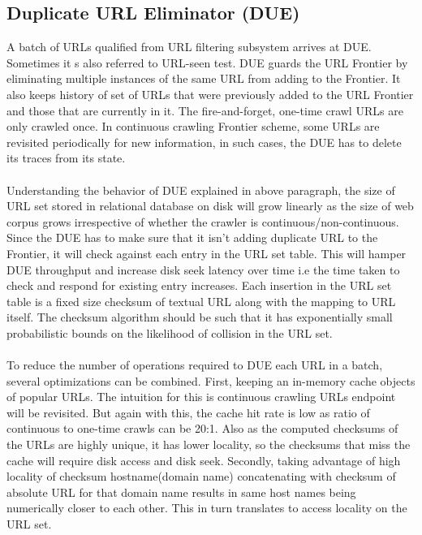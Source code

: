 \subsection{Duplicate URL Eliminator (DUE)}
A batch of URLs qualified from URL filtering subsystem arrives at DUE\cite{mercator}. Sometimes it s also referred to URL-seen test. DUE guards the URL Frontier by eliminating
multiple instances of the same URL from adding to the Frontier. It also keeps history of set of URLs that were previously added to the URL Frontier and those that are
currently in it. The fire-and-forget, one-time crawl URLs are only crawled once. In
continuous crawling Frontier scheme, some URLs are revisited periodically for new information, in such cases, the DUE has to delete its traces from its state.
\\
\\
\noindent
Understanding the behavior of DUE explained in above paragraph, the size of URL set stored in relational database on disk will grow linearly as the size of web corpus grows irrespective of whether the crawler is continuous/non-continuous. Since the DUE has to make sure that it isn't adding duplicate URL to the Frontier, it will check against each entry in the URL set table. This will hamper DUE throughput and increase disk seek latency over time i.e the time taken to check and respond for existing entry increases. Each insertion in the URL set table is a fixed size checksum of
textual URL along with the mapping to URL itself. The checksum algorithm should be
such that it has exponentially small probabilistic bounds on the likelihood of
collision in the URL set.
\\
\\
To reduce the number of operations required to DUE each URL in a batch, several
optimizations can be combined. First, keeping an in-memory cache objects of popular URLs. The intuition for this is continuous crawling URLs endpoint will be revisited. But again with this, the cache hit rate is low as ratio of continuous to one-time crawls can be 20:1. Also as the computed checksums of the URLs are highly unique, it has lower locality, so the checksums that miss the cache will require disk access and disk seek. Secondly, taking advantage of high locality of checksum hostname(domain name) concatenating with checksum of absolute URL for that domain name results in
same host names being numerically closer to each other. This in turn translates to
access locality on the URL set.

